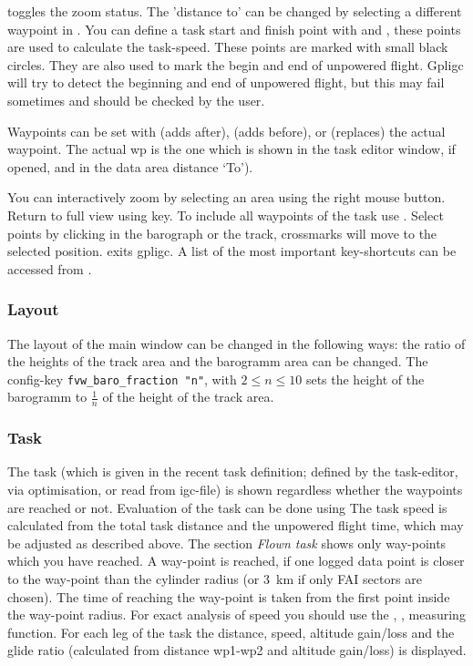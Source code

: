  toggles the zoom status.
The 'distance to' can be changed by selecting a different waypoint in .
You can define a task start and finish point with  and , these points are
used to calculate the task-speed. These points are marked with small black circles.
They are also used to mark the begin and end of unpowered flight.
Gpligc will try to detect the beginning and end of unpowered flight, but this may fail sometimes and should be checked by the user.

Waypoints can be set with  (adds after),  (adds before), or  (replaces) the actual waypoint.
The actual wp is the one which is shown in the task editor window, if opened, and in the data area distance `To').

You can interactively zoom by selecting an area using the right mouse button. Return to full view using  key. To include all waypoints of the task use .
Select points by clicking in the barograph or the track, crossmarks will move to the selected position.
 exits gpligc.
A list of the most important key-shortcuts can be accessed from .

\subsubsection{Layout}
The layout of the main window can be changed in the following ways:
the ratio of the heights of the track area and the barogramm area can be changed.
The config-key \texttt{fvw\_baro\_fraction "n"}, with $2 \le n \le 10$ sets the height of the barogramm to $\frac{1}{n}$ of the height of the track area.


\subsubsection{Task}
The task (which is given in the recent task definition; defined by the task-editor, via optimisation, or read from igc-file) is shown regardless whether the waypoints are reached or not.
Evaluation of the task can be done using 
The task speed is calculated from the total task distance and the unpowered flight time, which may be adjusted as described above.
The section \emph{Flown task} shows only way-points which you have reached. A way-point is reached, if one logged data point is closer to the way-point than the cylinder radius (or 3~km if only FAI sectors are chosen). The time of reaching the way-point is taken from the first point inside the way-point radius.
For exact analysis of speed you should use the , ,  measuring function.
For each leg of the task the distance, speed, altitude gain/loss and the glide ratio (calculated from distance wp1-wp2 and altitude gain/loss) is displayed.


